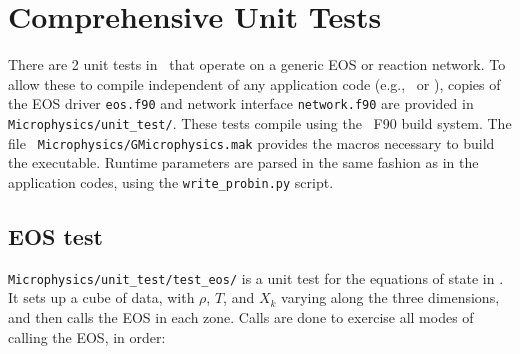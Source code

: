 \label{ch:unit_tests}

\section{Comprehensive Unit Tests}

There are 2 unit tests in \microphysics\ that operate on a generic EOS
or reaction network.  To allow these to compile independent of any
application code (e.g., \maestro\ or \castro), copies of the EOS
driver {\tt eos.f90} and network interface {\tt network.f90} are
provided in {\tt Microphysics/unit\_test/}.  These tests compile using
the \amrex\ F90 build system.  The file {\tt
  Microphysics/GMicrophysics.mak} provides the macros necessary to
build the executable.  Runtime parameters are parsed in the same
fashion as in the application codes, using the {\tt write\_probin.py}
script.

\subsection{EOS test}

{\tt Microphysics/unit\_test/test\_eos/} is a unit test for the
equations of state in \microphysics.  It sets up a cube of data, with
$\rho$, $T$, and $X_k$ varying along the three dimensions, and then
calls the EOS in each zone.  Calls are done to exercise all modes of
calling the EOS, in order:

